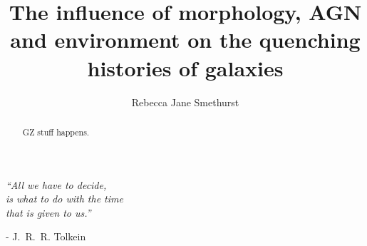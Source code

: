 \documentclass[12pt,useAMS]{ociamthesis}  %
\title{The influence of morphology, AGN and environment on the quenching histories of galaxies}   %
\author{Rebecca Jane Smethurst}             %
\begin{document}
 
\setcounter{secnumdepth}{3}
\setcounter{tocdepth}{3}


\maketitle                  %

\newpage
\vspace*{3cm}
\begin{center}
\emph{``All we have to decide, \\ is what to do with the time \\ that is given to us.''} \\\end{center} \begin{flushright}- J.~R.~R. Tolkein\end{flushright}

\newpage

\begin{abstract}  
GZ stuff happens.         %
\end{abstract}
\end{document}
